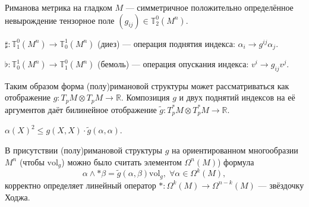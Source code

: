 \begin{to_def}
 	Риманова метрика на гладком $M$ --- симметричное положительно определённое невырождение тензорное поле $(g_{i j}) \in \mathbb{T}_2^0(M^n)$. 
 \end{to_def}

 \begin{to_def}
 	$\sharp \colon \mathbb{T}_1^0(M^n) \rightarrow \mathbb{T}_0^1(M^n)$ (диез) --- операция поднятия индекса: $\alpha_i \rightarrow g^{i j} \alpha_j$.
 \end{to_def}

 \begin{to_def}
 	$\flat \colon \mathbb{T}^1_0(M^n) \rightarrow \mathbb{T}^0_1(M^n)$ (бемоль) --- операция опускания индекса: $v^i \rightarrow g_{i j}v^j$.
 \end{to_def}

Таким образом форма (полу)римановой структуры может рассматриваться как отображение $g\colon T_pM \otimes T_pM \rightarrow \mathbb{R}$.
Композиция $g$ и двух поднятий индексов на её аргументов даёт билинейное отображение $\tilde{g}\colon T_p^*M \otimes T_p^*M \rightarrow \mathbb{R}$. 

\begin{to_tas}
	$\alpha(X)^2 \leq g(X,X) \cdot \tilde{g} (\alpha,\alpha)$.
\end{to_tas}

\begin{to_def}
	В присутствии (полу)римановой структуры $g$ на ориентированном многообразии $M^n$ (чтобы $\text{vol}_{g}$) можно было считать элементом $\Omega^n(M)$) формула 
	\begin{equation*}
		\alpha \wedge *\beta = \tilde{g}(\alpha,\beta) \text{vol}_g, \; \forall \alpha \in \Omega^k(M),	
	\end{equation*}
	корректно определяет линейный оператор $*\colon \Omega^k(M) \rightarrow \Omega^{n-k}(M)$ --- звёздочку Ходжа.
\end{to_def}